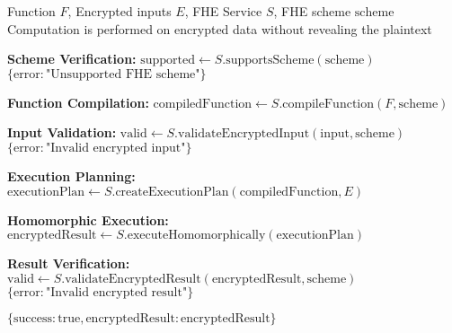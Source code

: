 \begin{protocol}
\label{prot:fhe-computation}
\begin{algorithmic}[1]
\Require Function $F$, Encrypted inputs $E$, FHE Service $S$, FHE scheme $\text{scheme}$
\Ensure Computation is performed on encrypted data without revealing the plaintext

\State \textbf{Scheme Verification:}
\State $\text{supported} \gets S.\text{supportsScheme}(\text{scheme})$
    \State \Return $\{\text{error}: \text{"Unsupported FHE scheme"}\}$
\EndIf

\State \textbf{Function Compilation:}
\State $\text{compiledFunction} \gets S.\text{compileFunction}(F, \text{scheme})$

\State \textbf{Input Validation:}
    \State $\text{valid} \gets S.\text{validateEncryptedInput}(\text{input}, \text{scheme})$
        \State \Return $\{\text{error}: \text{"Invalid encrypted input"}\}$
    \EndIf
\EndFor

\State \textbf{Execution Planning:}
\State $\text{executionPlan} \gets S.\text{createExecutionPlan}(\text{compiledFunction}, E)$

\State \textbf{Homomorphic Execution:}
\State $\text{encryptedResult} \gets S.\text{executeHomomorphically}(\text{executionPlan})$

\State \textbf{Result Verification:}
\State $\text{valid} \gets S.\text{validateEncryptedResult}(\text{encryptedResult}, \text{scheme})$
    \State \Return $\{\text{error}: \text{"Invalid encrypted result"}\}$
\EndIf

\State \Return $\{\text{success}: \text{true}, \text{encryptedResult}: \text{encryptedResult}\}$
\end{algorithmic}
\end{protocol}

